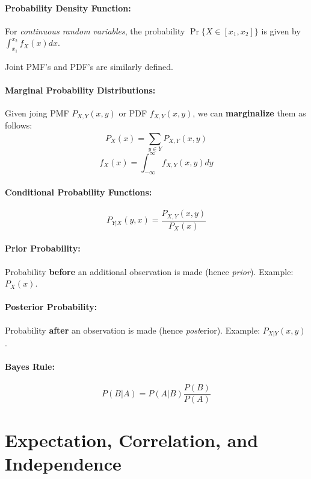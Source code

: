 \documentclass[a4paper,12pt]{report}
\begin{document}
\paragraph{Probability Density Function: } For \textit{continuous random variables}, the probability $\Pr\{X\in [x_1, x_2]\}$ is given by $\int_{x_1}^{x_2} f_X(x) dx$.

Joint PMF's and PDF's are similarly defined. 

\paragraph{Marginal Probability Distributions: } Given joing PMF $P_{X, Y}(x, y)$ or PDF $f_{X,Y}(x, y)$, we can \textbf{marginalize} them as follows:
\begin{equation}
P_X(x) = \sum_{y\in Y}^{} P_{X,Y}(x, y)
\end{equation}
\begin{equation}
f_X(x) = \int_{-\infty}^{\infty} f_{X,Y}(x,y)dy
\end{equation}

\paragraph{Conditional Probability Functions: } 
\begin{equation}
P_{Y|X}(y, x) = \frac{P_{X,Y}(x,y)}{P_X(x)} 
\end{equation}


\paragraph{Prior Probability: } Probability \textbf{before} an additional observation is made (hence \textit{prior}). Example: $P_X(x)$.

\paragraph{Posterior Probability: } Probability \textbf{after} an observation is made (hence \textit{post}erior). Example: $P_{X|Y}(x, y)$.

\paragraph{Bayes Rule: }
\begin{equation}
P(B|A) = P(A|B)\frac{P(B)}{P(A)}
\end{equation}

\section{Expectation, Correlation, and Independence} 
\end{document}
